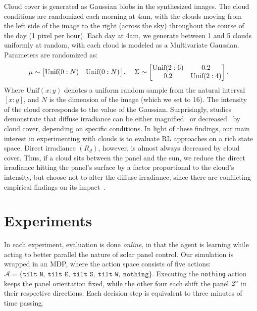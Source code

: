 \documentclass{article}
\newcommand{\mc}{\mathcal}
\begin{document}
Cloud cover is generated as Gaussian blobs in the synthesized images. The cloud conditions are randomized each morning at 4am, with the clouds moving from the left side of the image to the right (across the sky) throughout the course of the day (1 pixel per hour). Each day at 4am, we generate between 1 and 5 clouds uniformly at random, with each cloud is modeled as a Multivariate Gaussian. Parameters are randomized as:
\begin{align}
\mu \sim \begin{bmatrix}
\text{Unif}(0:N)&  \text{Unif}(0:N) \\
\end{bmatrix}, \hspace{4mm}
\Sigma \sim \begin{bmatrix}
\text{Unif}(2:6)&0.2 \\
0.2&\text{Unif}(2:4) \\
\end{bmatrix}.
\end{align}
Where $\text{Unif}(x:y)$ denotes a uniform random sample from the natural interval $[x:y]$, and $N$ is the dimension of the image (which we set to 16). The intensity of the cloud corresponds to the value of the Gaussian. Surprisingly, studies demonstrate that diffuse irradiance can be either magnified~\cite{robinson1966solar} or decreased~\cite{pfister2003cloud} by cloud cover, depending on specific conditions. In light of these findings, our main interest in experimenting with clouds is to evaluate RL approaches on a rich state space. Direct irradiance $(R_d)$, however, is almost always decreased by cloud cover. Thus, if a cloud sits between the panel and the sun, we reduce the direct irradiance hitting the panel's surface by a factor proportional to the cloud's intensity, but choose not to alter the diffuse irradiance, since there are conflicting empirical findings on its impact~\cite{robinson1966solar,pfister2003cloud}. %



\section{Experiments}

In each experiment, evaluation is done {\it online}, in that the agent is learning while acting to better parallel the nature of solar panel control. Our simulation is wrapped in an MDP, where the action space consists of five actions: $\mc{A} = \{\texttt{tilt N},\ \texttt{tilt E},\ \texttt{tilt S},\ \texttt{tilt W},\ \texttt{nothing}\}$. Executing the \texttt{nothing} action keeps the panel orientation fixed, while the other four each shift the panel $2\degree$ in their respective directions. Each decision step is equivalent to three minutes of time passing.
\end{document}
